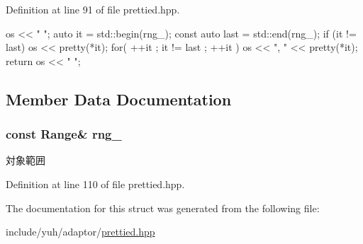 \-Definition at line 91 of file prettied.\-hpp.


\begin{DoxyCode}
            {
                os << "{ ";
                auto it = std::begin(rng_);
                const auto last = std::end(rng_);
                if (it != last)
                { 
                    os << pretty(*it);
                    for( ++it ; it != last ; ++it )
                    {
                        os << ", " << pretty(*it);
                    }
                }
                return os << " }";
            }
\end{DoxyCode}


\subsection{\-Member \-Data \-Documentation}
\hypertarget{structyuh_1_1range__detail_1_1range__io_a1dc23cf32ae84636d442489c9629b987}{
\subsubsection[{rng\-\_\-}]{\setlength{\rightskip}{0pt plus 5cm}const \-Range\& {\bf rng\-\_\-}}}\label{da/d75/structyuh_1_1range__detail_1_1range__io_a1dc23cf32ae84636d442489c9629b987}
対象範囲 

\-Definition at line 110 of file prettied.\-hpp.



\-The documentation for this struct was generated from the following file\-:\begin{DoxyCompactItemize}
\item 
include/yuh/adaptor/\hyperlink{prettied_8hpp}{prettied.\-hpp}\end{DoxyCompactItemize}
